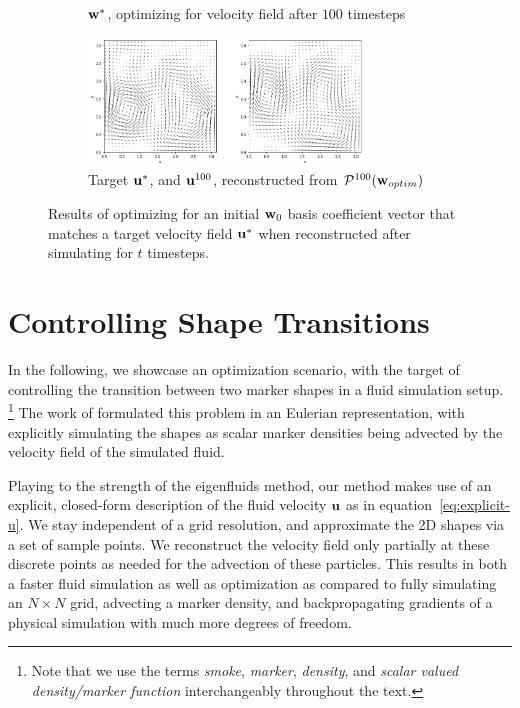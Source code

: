 \begin{figure}
\begin{subfigure}{\textwidth}
{    $\vb{w}^*$, optimizing for velocity field after $100$ timesteps\\}
    \label{fig:100-timesteps-coeffs}
  \end{subfigure}\par\medskip
  \begin{subfigure}{\textwidth}
    \centering
    \includegraphics[width=0.8\textwidth]{figures/finding-initial-velocities/t_100_velocities.png}
    \caption{Target $\vb{u}^*$, and $\vb{u}^{100}$, reconstructed from
      $\mathcal{P}^{100}(\vb{w}_{optim})$}
    \label{fig:100-timesteps-vel}
  \end{subfigure}
  \caption{Results of optimizing for an initial $\vb{w}_0$ basis coefficient
    vector that matches a target velocity field $\vb{u}^*$ when reconstructed
    after simulating for $t$ timesteps.
  }
  \label{fig:matching-velocities}
\end{figure}

\section{Controlling Shape Transitions}
\label{section:controlling-shape-transitions}
In the following, we showcase an optimization scenario, with the target of
controlling the transition between two marker shapes in a fluid simulation
setup. 
\footnote{Note that we use the terms \textit{smoke}, \textit{marker},
\textit{density}, and \textit{scalar valued density/marker function}
interchangeably throughout the text.}
The work of \cite{holl2019pdecontrol} formulated this problem in an
Eulerian representation, with explicitly simulating the shapes as scalar marker
densities being advected by the velocity field of the simulated fluid. 

Playing to the strength of the eigenfluids method, our method makes use of an
explicit, closed-form description of the fluid velocity $\vb{u}$ as in
equation~\eqref{eq:explicit-u}. We stay independent of a grid resolution, and
approximate the 2D shapes via a set of sample points. We reconstruct the
velocity field only partially at these discrete points as needed for the
advection of these particles. This results in both a faster fluid simulation as
well as optimization as compared to fully simulating an $N\times N$ grid,
advecting a marker density, and backpropagating gradients of a physical
simulation with much more degrees of freedom.

